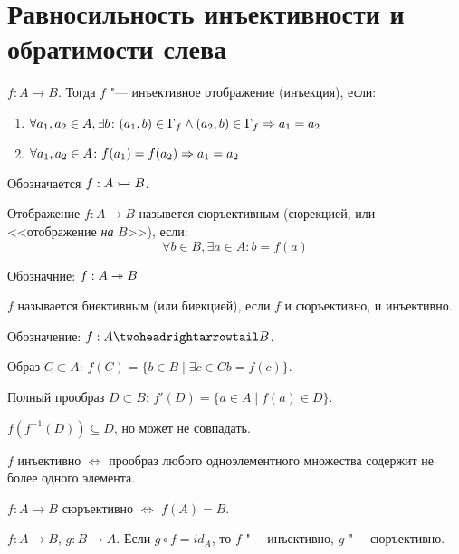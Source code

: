 ﻿\section{Равносильность инъективности и обратимости слева}

\begin{Def}
$f: A \to B$. Тогда $f$ "--- инъективное отображение (инъекция), если:

\begin{enumerate}
\item $\forall a_1, a_2 \in A, \exists b\colon (a_1, b) \in \Gamma_f \wedge (a_2, b) \in \Gamma_f \Rightarrow a_1 = a_2$
\item $\forall a_1, a_2 \in A\colon f(a_1) = f(a_2) \Rightarrow a_1 = a_2$
\end{enumerate}

Обозначается $f: A \rightarrowtail B$.
\end{Def}

\begin{Def}
Отображение $f: A \to B$ назывется сюръективным (сюрекцией, или <<отображение \textit{на} $B$>>), если:
\[\forall b \in B, \exists a \in A\colon b = f(a)\]

Обозначние: $f: A \twoheadrightarrow B$
\end{Def}

\begin{Def}
$f$ называется биективным (или биекцией), если $f$ и сюръективно, и инъективно.

Обозначение: $f: A \thrat B$.
\end{Def}

\begin{Def} 
Образ $C \subset A$: $f(C) = \{b \in B \mid \exists c \in C b = f(c)\}$.

Полный прообраз $D \subset B$: $f'(D) = \{a \in A \mid f(a) \in D\}$.
\end{Def}

$f(f^{-1}(D)) \subseteq D$, но может не совпадать.

$f$ инъективно $\iff$ прообраз любого одноэлементного множества содержит не более одного элемента.

$f : A \to B$ сюръективно $\iff$ $f(A) = B$.

\begin{theorem}{}
$f:A \to B$, $g:B \to A$. Если $g \circ f = id_A$, то $f$ "--- инъективно, $g$ "--- сюръективно.
\end{theorem}

